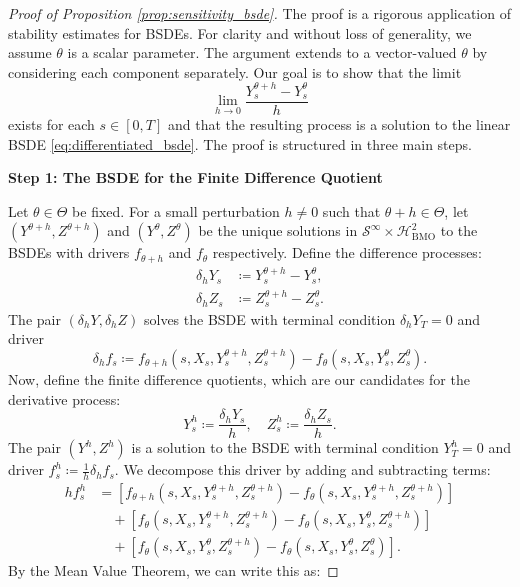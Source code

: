 \documentclass[qian]{imsart}
\theoremstyle{plain}
\theoremstyle{definition}
\begin{document}
\begin{proof}[Proof of Proposition \ref{prop:sensitivity_bsde}]
The proof is a rigorous application of stability estimates for BSDEs. For clarity and without loss of generality, we assume $\theta$ is a scalar parameter. The argument extends to a vector-valued $\theta$ by considering each component separately. Our goal is to show that the limit
\[ \lim_{h \to 0} \frac{Y^{\theta+h}_s - Y^{\theta}_s}{h} \]
exists for each $s \in [0,T]$ and that the resulting process is a solution to the linear BSDE \eqref{eq:differentiated_bsde}. The proof is structured in three main steps.

\textbf{Step 1: The BSDE for the Finite Difference Quotient}

Let $\theta \in \Theta$ be fixed. For a small perturbation $h \neq 0$ such that $\theta+h \in \Theta$, let $(Y^{\theta+h}, Z^{\theta+h})$ and $(Y^\theta, Z^\theta)$ be the unique solutions in $\mathcal{S}^{\infty} \times \mathcal{H}^2_{\mathrm{BMO}}$ to the BSDEs with drivers $f_{\theta+h}$ and $f_\theta$ respectively.
Define the difference processes:
\begin{align*}
    \delta_h Y_s &\coloneqq Y^{\theta+h}_s - Y^{\theta}_s, \\
    \delta_h Z_s &\coloneqq Z^{\theta+h}_s - Z^{\theta}_s.
\end{align*}
The pair $(\delta_h Y, \delta_h Z)$ solves the BSDE with terminal condition $\delta_h Y_T = 0$ and driver
\[ \delta_h f_s \coloneqq f_{\theta+h}(s, X_s, Y^{\theta+h}_s, Z^{\theta+h}_s) - f_{\theta}(s, X_s, Y^{\theta}_s, Z^{\theta}_s). \]
Now, define the finite difference quotients, which are our candidates for the derivative process:
\[ Y^h_s \coloneqq \frac{\delta_h Y_s}{h}, \quad Z^h_s \coloneqq \frac{\delta_h Z_s}{h}. \]
The pair $(Y^h, Z^h)$ is a solution to the BSDE with terminal condition $Y^h_T=0$ and driver $f^h_s \coloneqq \frac{1}{h}\delta_h f_s$. We decompose this driver by adding and subtracting terms:
\begin{align*}
    h f^h_s &= \left[ f_{\theta+h}(s, X_s, Y^{\theta+h}_s, Z^{\theta+h}_s) - f_{\theta}(s, X_s, Y^{\theta+h}_s, Z^{\theta+h}_s) \right] \\
    &\quad + \left[ f_{\theta}(s, X_s, Y^{\theta+h}_s, Z^{\theta+h}_s) - f_{\theta}(s, X_s, Y^{\theta}_s, Z^{\theta+h}_s) \right] \\
    &\quad + \left[ f_{\theta}(s, X_s, Y^{\theta}_s, Z^{\theta+h}_s) - f_{\theta}(s, X_s, Y^{\theta}_s, Z^{\theta}_s) \right].
\end{align*}
By the Mean Value Theorem, we can write this as:

\end{proof}
\end{document}
